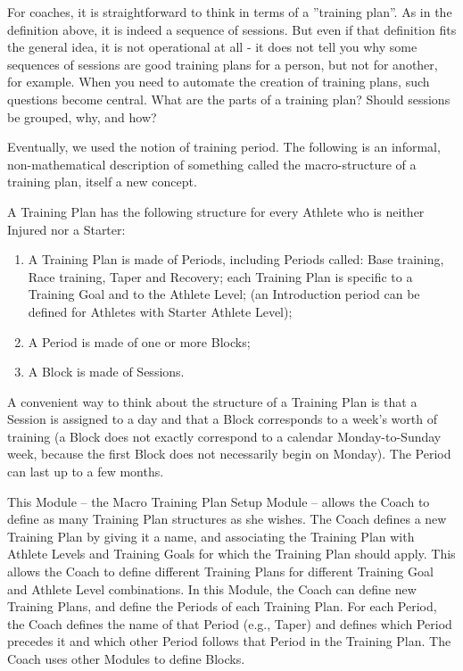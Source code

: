 \documentclass[graybox,envcountchap,sectrefs]{svmono}
\begin{document}
For coaches, it is straightforward to think in terms of a ''training plan''. As in the definition above, it is indeed a sequence of sessions. But even if that definition fits the general idea, it is not operational at all - it does not tell you why some sequences of sessions are good training plans for a person, but not for another, for example. When you need to automate the creation of training plans, such questions become central. What are the parts of a training plan? Should sessions be grouped, why, and how?

Eventually, we used the notion of training period. The following is an informal, non-mathematical description of something called the macro-structure of a training plan, itself a new concept.

\begin{svgraybox}
A Training Plan has the following structure for every Athlete who is neither Injured nor a Starter:

\begin{enumerate}
	\item A Training Plan is made of Periods, including Periods called: Base training, Race training, Taper and Recovery; each Training Plan is specific to a Training Goal and to the Athlete Level; (an Introduction period can be defined for Athletes with Starter Athlete Level);
	\item A Period is made of one or more Blocks;
	\item A Block is made of Sessions. 
\end{enumerate}

A convenient way to think about the structure of a Training Plan is that a Session is assigned to a day and that a Block corresponds to a week’s worth of training (a Block does not exactly correspond to a calendar Monday-to-Sunday week, because the first Block does not necessarily begin on Monday). The Period can last up to a few months.
 
This Module – the Macro Training Plan Setup Module – allows the Coach to define as many Training Plan structures as she wishes. The Coach defines a new Training Plan by giving it a name, and associating the Training Plan with Athlete Levels and Training Goals for which the Training Plan should apply. This allows the Coach to define different Training Plans for different Training Goal and Athlete Level combinations. In this Module, the Coach can define new Training Plans, and define the Periods of each Training Plan. For each Period, the Coach defines the name of that Period (e.g., Taper) and defines which Period precedes it and which other Period follows that Period in the Training Plan. The Coach uses other Modules to define Blocks.
\end{svgraybox}
\end{document}
